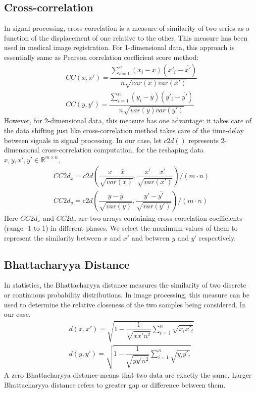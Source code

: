 \documentclass[12pt]{report} %
\begin{document}
\subsection{Cross-correlation}
In signal processing, cross-correlation\cite{CC} is a measure of similarity of two series as a function of the displacement of one relative to the other. This measure has been used in medical image registration. For 1-dimensional data, this approach is essentially same as Pearson correlation coefficient score method:
\begin{equation}
\begin{split}
&CC(x,x')=\dfrac{\sum_{i=1}^{n} (x_i-\overline{x})(x'_i-\overline{x'})}{n \sqrt{var(x)var(x')}}\\
&CC(y,y')=\dfrac{\sum_{i=1}^{n} (y_i-\overline{y})(y'_i-\overline{y'})}{n \sqrt{var(y)var(y')}}
\end{split}
\end{equation}
However, for 2-dimensional data, this measure has one advantage: it takes care of the data shifting just like cross-correlation method takes care of the time-delay between signals in signal processing. In our case, let $c2d()$ represents 2-dimensional cross-correlation computation, for the reshaping data $x,y,x',y' \in \mathbb{R}^{m\times n}$,
\begin{equation}
\begin{split}
&CC2d_x = c2d(\dfrac{x-\overline{x}}{\sqrt{var(x)}},\dfrac{x'-\overline{x'}}{\sqrt{var(x')}})/(m\cdot n) \\
&CC2d_y = c2d(\dfrac{y-\overline{y}}{\sqrt{var(y)}},\dfrac{y'-\overline{y'}}{\sqrt{var(y')}})/(m\cdot n)
\end{split}
\end{equation}
Here $CC2d_x$ and $CC2d_y$ are two arrays containing cross-correlation coefficients (range -1 to 1) in different phases. We select the maximum values of them to represent the similarity between $x$ and $x'$ and between $y$ and $y'$ respectively.

\subsection{Bhattacharyya Distance}
In statistics, the Bhattacharyya distance\cite{BD,BD2,ISA} measures the similarity of two discrete or continuous probability distributions. In image processing, this measure can be used to determine the relative closeness of the two samples being considered. In our case\cite{ISA},
\begin{equation}
\begin{split}
&d(x,x')=\sqrt{1-\dfrac{1}{\sqrt{\overline{xx'}n^2}}\sum_{i=1}^{n} \sqrt{x_{i}x'_{i}}}\\
&d(y,y')=\sqrt{1-\dfrac{1}{\sqrt{\overline{yy'}n^2}}\sum_{i=1}^{n} \sqrt{y_{i}y'_{i}}}
\end{split}
\end{equation}
A zero Bhattacharyya distance means that two data are exactly the same. Larger Bhattacharyya distance refers to greater gap or difference between them.
\end{document}
